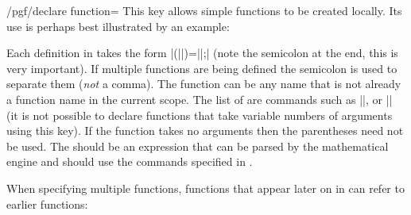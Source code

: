 \begin{key}{/pgf/declare function=}
  This key allows simple functions to be created locally. Its use
  is perhaps best illustrated by an example:

\begin{codeexample}[]
\end{codeexample}

  Each definition in  takes the form
  |(||)=||;| (note the
  semicolon at the end, this is very important). If multiple
  functions are being defined the semicolon is used to separate
  them (\emph{not} a comma).
  The function  can be any name that is not already a
  function name in the current scope. The list of 
  are commands such as |\x|, or |\y| (it is not possible to declare
  functions that take variable numbers of arguments using this key).
  If the function takes no arguments then the parentheses need not
  be used.
  The  should be an expression that can be
  parsed by the mathematical engine and should use the commands
  specified in .

  When specifying multiple functions, functions that appear later
  on in  can refer to earlier functions:

\begin{codeexample}[]
\end{codeexample}

\end{key}
